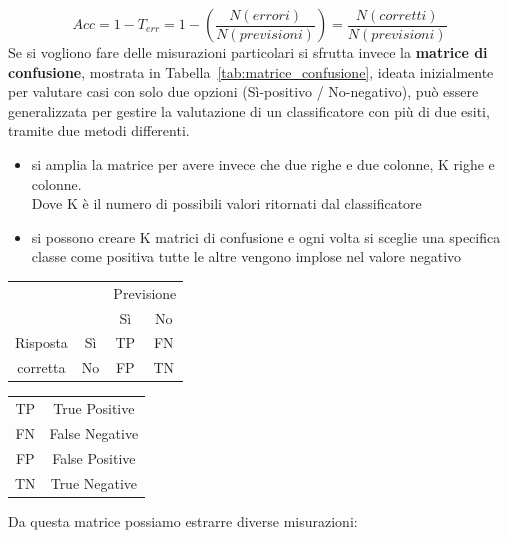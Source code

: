 %
\begin{equation}
	Acc = 1 - T_{err} = 1 - \left( \frac{N(errori)}{N(previsioni)} \right) = \frac{N(corretti)}{N(previsioni)}
	\label{eq:accuratezza}
\end{equation}
%
Se si vogliono fare delle misurazioni particolari si sfrutta invece la \textbf{matrice di confusione}, mostrata in Tabella~\ref{tab:matrice_confusione}, ideata inizialmente per valutare casi con solo due opzioni (Sì-positivo / No-negativo), può essere generalizzata per gestire la valutazione di un classificatore con più di due esiti, tramite due metodi differenti.
\begin{itemize}
	\item si amplia la matrice per avere invece che due righe e due colonne, K righe e colonne.\\
	Dove K è il numero di possibili valori ritornati dal classificatore
	\item si possono creare K matrici di confusione e ogni volta si sceglie una specifica classe come positiva tutte le altre vengono implose nel valore negativo
\end{itemize}
%
\begin{multicols}{2}
\begin{center}
	\begin{tabular}{cc|c|c|}
		 &  & \multicolumn{2}{|c|}{Previsione}\\
		 &  & Sì & No\\
		 \hline
		 Risposta & Sì & TP & FN\\
		 \hline
		 corretta & No & FP & TN\\
		\hline
	\end{tabular}
	\label{tab:matrice_confusione}
	\begin{tabular}{|c|c|}
		\hline
		TP & True Positive \\
		FN & False Negative \\
		FP & False Positive \\
		TN & True Negative \\
		\hline
	\end{tabular}
	\label{tab:MC_significato}
\end{center}
\end{multicols}
%
Da questa matrice possiamo estrarre diverse misurazioni:
